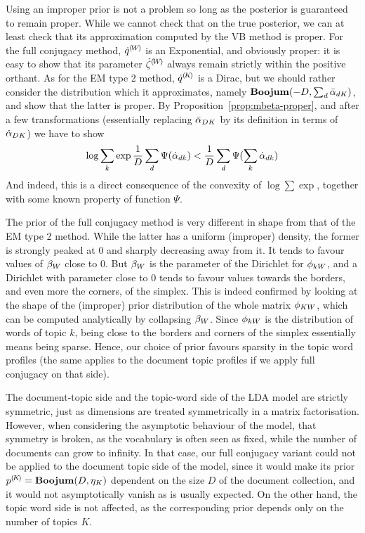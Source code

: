 Using an improper prior is not a problem so long as the posterior is guaranteed to remain proper. While we cannot check that on the true posterior, we can at least check that its approximation computed by the VB method is proper. For the full conjugacy method, ${\dot{q}}^{(\!{W}\!)}$ is an Exponential, and obviously proper: it is easy to show that its parameter ${\dot{\zeta}}^{(\!{W}\!)}$ always remain strictly within the positive orthant. As for the EM type 2 method, ${\dot{q}}^{(\!{K}\!)}$ is a Dirac, but we should rather consider the distribution which it approximates, namely $\mathbf{Boojum}(-D,\sum_d\bar{\alpha}_{dK})$, and show that the latter is proper. By Proposition~\ref{prop:mbeta-proper}, and after a few transformations (essentially replacing $\bar{\alpha}_{DK}$ by its definition in terms of $\dot{\alpha}_{DK}$) we have to show
\[
\log\sum_k\exp\frac{1}{D}\sum_d\Psi(\dot{\alpha}_{dk})<\frac{1}{D}\sum_{d}\Psi(\sum_k\dot{\alpha}_{dk})
\]
And indeed, this is a direct consequence of the convexity of $\log\sum\exp$, together with some known property of function $\Psi$.

The prior of the full conjugacy method is very different in shape from that of the EM type 2 method. While the latter has a uniform (improper) density, the former is strongly peaked at $0$ and sharply decreasing away from it. It tends to favour values of $\beta_W$ close to $0$. But $\beta_W$ is the parameter of the Dirichlet for $\phi_{kW}$, and a Dirichlet with parameter close to 0 tends to favour values towards the borders, and even more the corners, of the simplex. This is indeed confirmed by looking at the shape of the (improper) prior distribution of the whole matrix $\phi_{KW}$, which can be computed analytically by collapsing $\beta_W$. Since $\phi_{kW}$ is the distribution of words of topic $k$, being close to the borders and corners of the simplex essentially means being sparse. Hence, our choice of prior favours sparsity in the topic word profiles (the same applies to the document topic profiles if we apply full conjugacy on that side).

The document-topic side and the topic-word side of the LDA model are strictly symmetric, just as dimensions are treated symmetrically in a matrix factorisation. However, when considering the asymptotic behaviour of the model, that symmetry is broken, as the vocabulary is often seen as fixed, while the number of documents can grow to infinity. In that case, our full conjugacy variant could not be applied to the document topic side of the model, since it would make its prior ${p}^{(\!{K}\!)}=\mathbf{Boojum}(D,\eta_K)$ dependent on the size $D$ of the document collection, and it would not asymptotically vanish as is usually expected. On the other hand, the topic word side is not affected, as the corresponding prior depends only on the number of topics $K$.